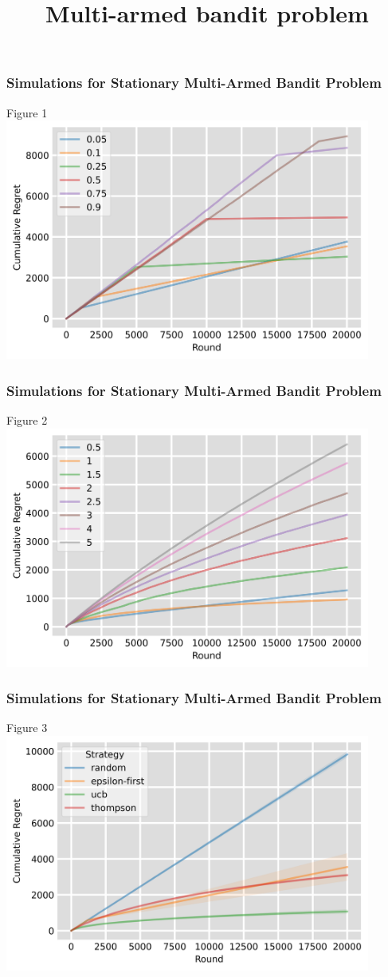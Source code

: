 \documentclass{beamer}
\title{Multi-armed bandit problem}
\subtitle{}
\author{}
\institute %
{}
\date %
{}
\begin{document}
    \begin{frame}
        \frametitle{Simulations for Stationary Multi-Armed Bandit Problem}
        Figure 1
        \includegraphics[width=0.9\textwidth]{../report/figures/epsilon_plot}
    \end{frame}

    \begin{frame}
        \frametitle{Simulations for Stationary Multi-Armed Bandit Problem}
        Figure 2
        \includegraphics[width=0.9\textwidth]{../report/figures/ucb_plot}
    \end{frame}

    \begin{frame}
        \frametitle{Simulations for Stationary Multi-Armed Bandit Problem}
        Figure 3
        \includegraphics[width=0.9\textwidth]{../report/figures/comparison_of_all_strategies_100_machines}
    \end{frame}
\end{document}
